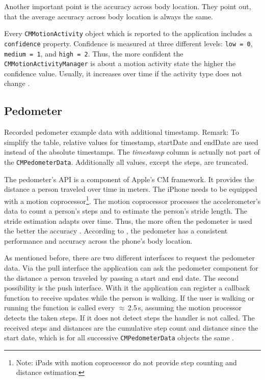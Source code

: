 Another important point is the accuracy across body location. They point out, that the average accuracy across body location is always the same.

Every \texttt{CMMotionActivity} object which is reported to the application includes a \texttt{confidence} property. Confidence is measured at three different levels: \texttt{low\,=\,0}, \texttt{medium\,=\,1}, and \texttt{high\,=\,2}. Thus, the more confident the \texttt{CMMotionActivityManager} is about a motion activity state the higher the confidence value. Usually, it increases over time if the activity type does not change \citep{apple:wwdc_2014_pham,apple:ios_doc_cm}.


\subsection{Pedometer}
\begin{table}
	
	\caption{Recorded pedometer example data with additional timestamp. Remark: To simplify the table, relative values for timestamp, startDate and endDate are used instead of the absolute timestamps. The \emph{timestamp} column is actually not part of the \texttt{CMPedometerData}. Additionally all values, except the steps, are truncated.}
	\label{tab:pedometerExampleData}
\end{table}

The pedometer's \acs{API} is a component of Apple's \acs{CM} framework. It provides the distance a person traveled over time in meters. The iPhone needs to be equipped with a motion coprocessor\footnote{Note: iPads with motion coprocessor do not provide step counting and distance estimation.}. The motion coprocessor processes the accelerometer's data to count a person's steps and to estimate the person's stride length. The stride estimation adapts over time. Thus, the more often the pedometer is used the better the accuracy \citep{apple:wwdc_2014_pham}. According to \citet{apple:wwdc_2014_pham}, the pedometer has a consistent performance and accuracy across the phone's body location.

As mentioned before, there are two different interfaces to request the pedometer data. Via the pull interface the application can ask the pedometer component for the distance a person traveled by passing a start and end date. The second possibility is the push interface. With it the application can register a callback function to receive updates while the person is walking. If the user is walking or running the function is called every $\approx$\,2.5\,s, assuming the motion processor detects the taken steps. If it does not detect steps the handler is not called. The received steps and distances are the cumulative step count and distance since the start date, which is for all successive \texttt{CMPedometerData} objects the same \citep{apple:wwdc_2014_pham}.

